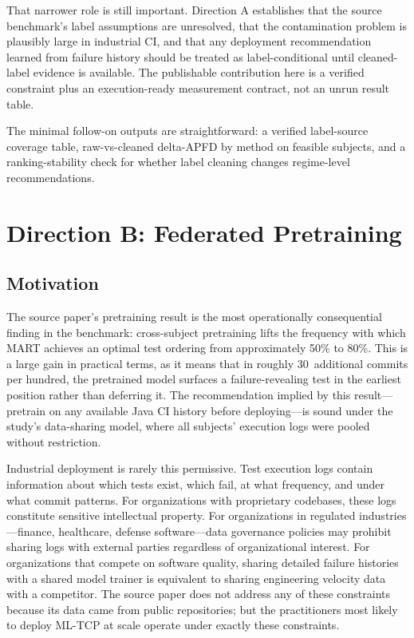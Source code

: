 \documentclass[10pt,conference]{IEEEtran}
\begin{document}
That narrower role is still important. Direction A establishes that the source benchmark's label assumptions are unresolved, that the contamination problem is plausibly large in industrial CI, and that any deployment recommendation learned from failure history should be treated as label-conditional until cleaned-label evidence is available. The publishable contribution here is a verified constraint plus an execution-ready measurement contract, not an unrun result table.

The minimal follow-on outputs are straightforward: a verified label-source coverage table, raw-vs-cleaned delta-APFD by method on feasible subjects, and a ranking-stability check for whether label cleaning changes regime-level recommendations.

\section{Direction B: Federated Pretraining}\label{sec:direction_b}

\subsection{Motivation}

The source paper's pretraining result is the most operationally consequential finding in the benchmark: cross-subject pretraining lifts the frequency with which MART achieves an optimal test ordering from approximately 50\% to 80\%. This is a large gain in practical terms, as it means that in roughly 30~additional commits per hundred, the pretrained model surfaces a failure-revealing test in the earliest position rather than deferring it. The recommendation implied by this result---pretrain on any available Java CI history before deploying---is sound under the study's data-sharing model, where all subjects' execution logs were pooled without restriction.

Industrial deployment is rarely this permissive. Test execution logs contain information about which tests exist, which fail, at what frequency, and under what commit patterns. For organizations with proprietary codebases, these logs constitute sensitive intellectual property. For organizations in regulated industries---finance, healthcare, defense software---data governance policies may prohibit sharing logs with external parties regardless of organizational interest. For organizations that compete on software quality, sharing detailed failure histories with a shared model trainer is equivalent to sharing engineering velocity data with a competitor. The source paper does not address any of these constraints because its data came from public repositories; but the practitioners most likely to deploy ML-TCP at scale operate under exactly these constraints.
\end{document}
